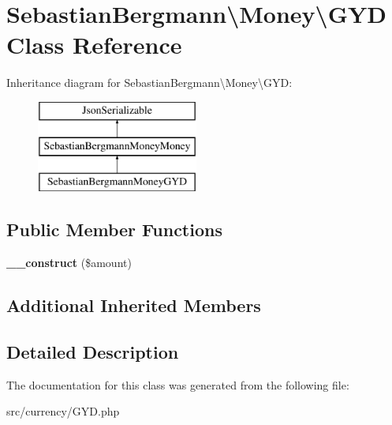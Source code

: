 \hypertarget{classSebastianBergmann_1_1Money_1_1GYD}{}\section{Sebastian\+Bergmann\textbackslash{}Money\textbackslash{}G\+Y\+D Class Reference}
\label{classSebastianBergmann_1_1Money_1_1GYD}
Inheritance diagram for Sebastian\+Bergmann\textbackslash{}Money\textbackslash{}G\+Y\+D\+:\begin{figure}[H]
\begin{center}
\leavevmode
\includegraphics[height=3.000000cm]{classSebastianBergmann_1_1Money_1_1GYD}
\end{center}
\end{figure}
\subsection*{Public Member Functions}
\begin{DoxyCompactItemize}
\item 
\hypertarget{classSebastianBergmann_1_1Money_1_1GYD_a9bf42114ba5d37562341088d4afaa8f0}{}{\bfseries \+\_\+\+\_\+construct} (\$amount)\label{classSebastianBergmann_1_1Money_1_1GYD_a9bf42114ba5d37562341088d4afaa8f0}

\end{DoxyCompactItemize}
\subsection*{Additional Inherited Members}


\subsection{Detailed Description}


The documentation for this class was generated from the following file\+:\begin{DoxyCompactItemize}
\item 
src/currency/G\+Y\+D.\+php\end{DoxyCompactItemize}
